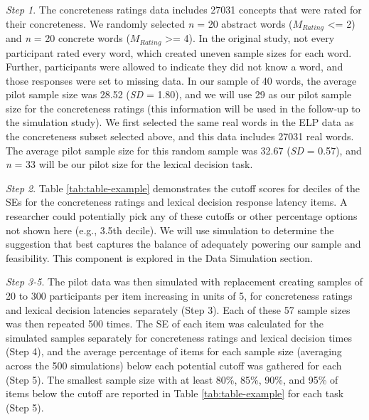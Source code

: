 \documentclass[
  man]{apa7}
\begin{document}
\emph{Step 1}. The concreteness ratings data includes 27031 concepts that were rated for their concreteness. We randomly selected \emph{n} = 20 abstract words (\(M_{Rating}\) \textless= 2) and \emph{n} = 20 concrete words (\(M_{Rating}\) \textgreater= 4). In the original study, not every participant rated every word, which created uneven sample sizes for each word. Further, participants were allowed to indicate they did not know a word, and those responses were set to missing data. In our sample of 40 words, the average pilot sample size was 28.52 (\emph{SD} = 1.80), and we will use 29 as our pilot sample size for the concreteness ratings (this information will be used in the follow-up to the simulation study). We first selected the same real words in the ELP data as the concreteness subset selected above, and this data includes 27031 real words. The average pilot sample size for this random sample was 32.67 (\emph{SD} = 0.57), and \emph{n} = 33 will be our pilot size for the lexical decision task.

\emph{Step 2}. Table \ref{tab:table-example} demonstrates the cutoff scores for deciles of the SEs for the concreteness ratings and lexical decision response latency items. A researcher could potentially pick any of these cutoffs or other percentage options not shown here (e.g., 3.5th decile). We will use simulation to determine the suggestion that best captures the balance of adequately powering our sample and feasibility. This component is explored in the Data Simulation section.

\emph{Step 3-5}. The pilot data was then simulated with replacement creating samples of 20 to 300 participants per item increasing in units of 5, for concreteness ratings and lexical decision latencies separately (Step 3). Each of these 57 sample sizes was then repeated 500 times. The SE of each item was calculated for the simulated samples separately for concreteness ratings and lexical decision times (Step 4), and the average percentage of items for each sample size (averaging across the 500 simulations) below each potential cutoff was gathered for each (Step 5). The smallest sample size with at least 80\%, 85\%, 90\%, and 95\% of items below the cutoff are reported in Table \ref{tab:table-example} for each task (Step 5).
\end{document}
